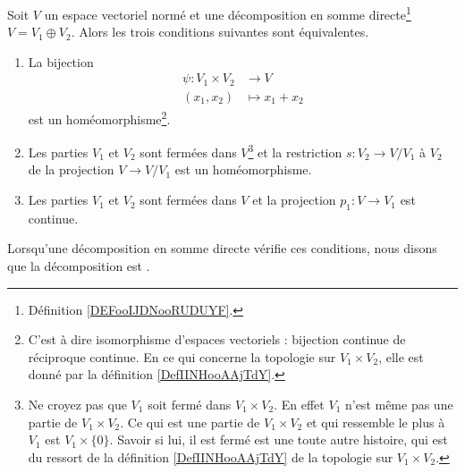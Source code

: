 \begin{propositionDef}     \label{PropKZDqTR}
    Soit \( V\) un espace vectoriel normé et une décomposition en somme directe\footnote{Définition \ref{DEFooIJDNooRUDUYF}.} \( V=V_1\oplus V_2\). Alors les trois conditions suivantes sont équivalentes.
	\begin{enumerate}
        \item       \label{ITEMooMUELooWdJQeW}
            La bijection 
            \begin{equation}
                \begin{aligned}
                    \psi\colon V_1\times V_2&\to V \\
                    (x_1,x_2)&\mapsto x_1+x_2 
                \end{aligned}
            \end{equation}
            est un homéomorphisme\footnote{C'est à dire isomorphisme d'espaces vectoriels : bijection continue de réciproque continue. En ce qui concerne la topologie sur \( V_1\times V_2\), elle est donné par la définition \ref{DefIINHooAAjTdY}.}.
        \item       \label{ITEMooDKOYooUpEfOR}
            Les parties \( V_1\) et \( V_2\) sont fermées dans \( V\)\footnote{Ne croyez pas que \( V_1\) soit fermé dans \( V_1\times V_2\). En effet \( V_1\) n'est même pas une partie de \( V_1\times V_2\). Ce qui est une partie de \( V_1\times V_2\) et qui ressemble le plus à \( V_1\) est \( V_1\times \{ 0 \}\). Savoir si lui, il est fermé est une toute autre histoire, qui est du ressort de la définition \ref{DefIINHooAAjTdY} de la topologie sur \( V_1\times V_2\).} et la restriction \( s\colon V_2\to V/V_1\) à \( V_2\) de la projection \( V\to V/V_1\) est un homéomorphisme.
        \item       \label{ITEMooFSSMooCQzTIc}
            Les parties \( V_1\) et \( V_2\) sont fermées dans \( V\) et la projection \( p_1\colon V \to V_1 \) est continue.
	\end{enumerate}
    Lorsqu'une décomposition en somme directe vérifie ces conditions, nous disons que la décomposition est .
\end{propositionDef}

